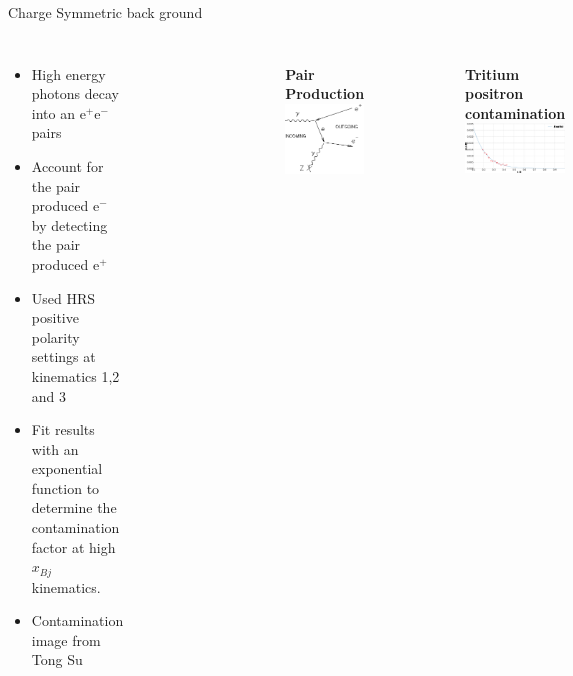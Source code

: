 \documentclass{beamer}
\begin{document}
\begin{frame}{Charge Symmetric back ground}
\vspace{-20pt}
\begin{block}{}
	\begin{columns}
		\begin{itemize}
			\item High energy photons decay into an e$^+$e$^-$ pairs
			\item Account for the pair produced e$^-$ by detecting the pair produced e$^+$
			\item Used HRS positive polarity settings at kinematics 1,2 and 3
			\item Fit results with an exponential function to determine the contamination factor at high $x_{Bj}$ kinematics.
			\item Contamination image from Tong Su
		\end{itemize}
		\begin{figure}
			
		\end{figure}
		\vspace{-40pt}
		\begin{figure}
			\textbf{Pair Production}
			\includegraphics[width=3.0cm]{../images/pp_FD.png}
		\end{figure}
		\vspace{-20pt}
		\begin{figure}
			\textbf{Tritium positron contamination}
			\includegraphics[width=5.0cm]{../images/positron_H3_bane.pdf}
		\end{figure}

	\end{columns}
	
\end{block}
\end{frame}
\end{document}
